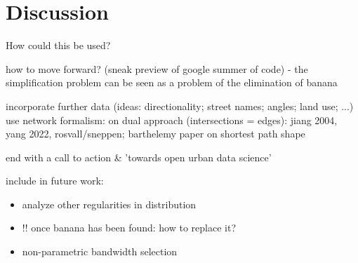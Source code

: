 \section{Discussion}
\label{sec:discussion}

How could this be used?

how to move forward? (sneak preview of google summer of code) - the simplification problem can be seen as a problem of the elimination of banana

incorporate further data (ideas: directionality; street names; angles; land use; ...)
use network formalism: on dual approach (intersections = edges): jiang 2004, yang 2022,
rosvall/sneppen; barthelemy paper on shortest path shape

end with a call to action \& 'towards open urban data science'

\bigskip

include in future work:
\begin{itemize}
    \item analyze other regularities in distribution
    \item !! once banana has been found: how to replace it?
    \item non-parametric bandwidth selection
\end{itemize}